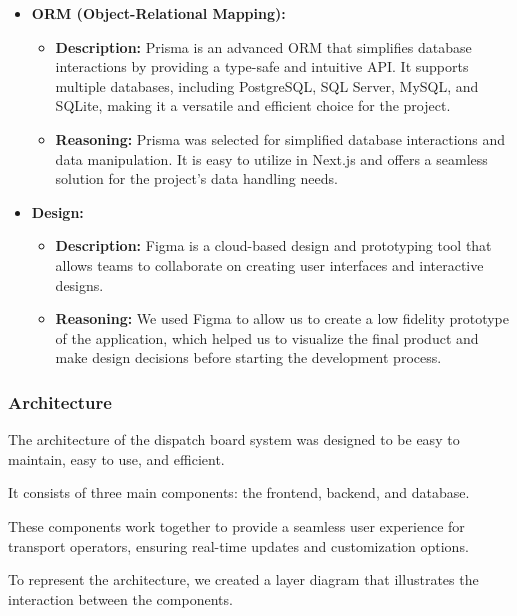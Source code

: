 \documentclass[10pt]{article}
\begin{document}
\begin{itemize}
                \item \textbf{ORM (Object-Relational Mapping):}
                \begin{itemize}
                    \item \textbf{Description:} Prisma is an advanced ORM that simplifies database interactions by providing a type-safe and intuitive API. It supports multiple databases, including PostgreSQL, SQL Server, MySQL, and SQLite, making it a versatile and efficient choice for the project.
                    \item \textbf{Reasoning:} Prisma was selected for simplified database interactions and data manipulation. It is easy to utilize in Next.js and offers a seamless solution for the project's data handling needs.
                \end{itemize}
                \item \textbf{Design:}
                \begin{itemize}
                    \item \textbf{Description:} Figma is a cloud-based design and prototyping tool that allows teams to collaborate on creating user interfaces and interactive designs.
                    \item \textbf{Reasoning:} We used Figma to allow us to create a low fidelity prototype of the application, which helped us to visualize the final product and make design decisions before starting the development process.
                \end{itemize}
        \end{itemize}


        \subsubsection{Architecture}
        The architecture of the dispatch board system was designed to be easy to maintain, easy to use, and efficient. 

        It consists of three main components: the frontend, backend, and database. 

        These components work together to provide a seamless user experience for transport operators, ensuring real-time updates and customization options. 

        To represent the architecture, we created a layer diagram that illustrates the interaction between the components.
\end{document}
